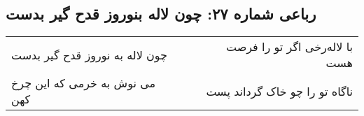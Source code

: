 \begin{center}
\section*{رباعی شماره ۲۷: چون لاله بنوروز قدح گیر بدست}
\label{sec:sh027}
\begin{longtable}{l p{0.5cm} r}
چون لاله به نوروز قدح گیر بدست
&&
با لاله‌رخی اگر تو را فرصت هست
\\
می نوش به خرمی که این چرخ کهن
&&
ناگاه تو را چو خاک گرداند پست
\\
\end{longtable}
\end{center}
